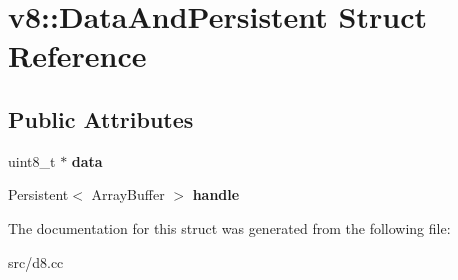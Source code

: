 \hypertarget{structv8_1_1_data_and_persistent}{}\section{v8\+:\+:Data\+And\+Persistent Struct Reference}
\label{structv8_1_1_data_and_persistent}
\subsection*{Public Attributes}
\begin{DoxyCompactItemize}
\item 
\hypertarget{structv8_1_1_data_and_persistent_a56a66b5345eabc97cf7535b9c2f35e83}{}uint8\+\_\+t $\ast$ {\bfseries data}\label{structv8_1_1_data_and_persistent_a56a66b5345eabc97cf7535b9c2f35e83}

\item 
\hypertarget{structv8_1_1_data_and_persistent_a917e10f61189fdc4a3eeb1c5b4946c98}{}Persistent$<$ Array\+Buffer $>$ {\bfseries handle}\label{structv8_1_1_data_and_persistent_a917e10f61189fdc4a3eeb1c5b4946c98}

\end{DoxyCompactItemize}


The documentation for this struct was generated from the following file\+:\begin{DoxyCompactItemize}
\item 
src/d8.\+cc\end{DoxyCompactItemize}
